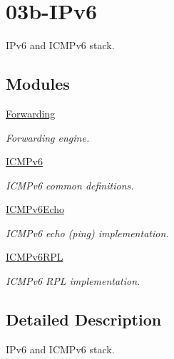 \hypertarget{group___i_pv6}{}\section{03b-\/\+I\+Pv6}
\label{group___i_pv6}


I\+Pv6 and I\+C\+M\+Pv6 stack.  


\subsection*{Modules}
\begin{DoxyCompactItemize}
\item 
\hyperlink{group___forwarding}{Forwarding}
\begin{DoxyCompactList}\small\item\em Forwarding engine. \end{DoxyCompactList}\item 
\hyperlink{group___i_c_m_pv6}{I\+C\+M\+Pv6}
\begin{DoxyCompactList}\small\item\em I\+C\+M\+Pv6 common definitions. \end{DoxyCompactList}\item 
\hyperlink{group___i_c_m_pv6_echo}{I\+C\+M\+Pv6\+Echo}
\begin{DoxyCompactList}\small\item\em I\+C\+M\+Pv6 echo (ping) implementation. \end{DoxyCompactList}\item 
\hyperlink{group___i_c_m_pv6_r_p_l}{I\+C\+M\+Pv6\+R\+PL}
\begin{DoxyCompactList}\small\item\em I\+C\+M\+Pv6 R\+PL implementation. \end{DoxyCompactList}\end{DoxyCompactItemize}


\subsection{Detailed Description}
I\+Pv6 and I\+C\+M\+Pv6 stack. 

